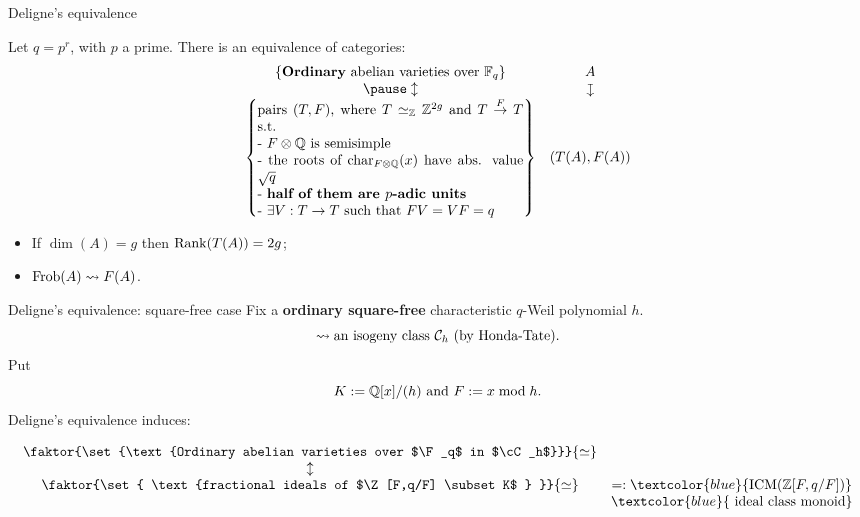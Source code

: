 \documentclass{beamer}
\begin{document}
\begin{frame}{ Deligne's equivalence }
\begin{theorem}[Deligne '69]
Let $q=p^r$, with $p$ a prime. There is an equivalence of categories:
\[\begin{array}{cc}
\set{\text{\textbf{Ordinary} abelian varieties over $\F_q$}}	& A \\
\pause \updownarrow							& \downmapsto \\
\set{\parbox[p]{19em}{pairs $(T,F)$, where $T\simeq_\Z \Z^{2g}$ and $T\overset{F}{\to} T$ s.t.\\
- $F\otimes \Q$ is semisimple\\
- the roots of $\Char_{F\otimes\Q}(x)$ have abs. value $\sqrt{q}$\\
- \textbf{half of them are $p$-adic units}\\
- $\exists V:T\to T$ such that $FV=VF=q$
}}	& (T(A),F(A))
\end{array}\]
\end{theorem}
\pause
\begin{remark}
\begin{itemize}
 \item If $\dim(A)=g$ then $\operatorname{Rank}(T(A))=2g$;
 \item $\operatorname{Frob}(A)\rightsquigarrow F(A)$.
\end{itemize}
\end{remark}
\end{frame}

\begin{frame}{ Deligne's equivalence: square-free case}
Fix a \textbf{ordinary square-free} characteristic $q$-Weil polynomial $h$.\\
\[\rightsquigarrow \text{an isogeny class ${\mathcal C}_h$ (by Honda-Tate)}.\]
\pause Put 
\[K := \mathbb{Q}[x]/(h) \text{ and } F:= x \bmod h. \]
\pause Deligne's equivalence induces:
\begin{theorem}
\vspace{-5mm}\[\begin{array}{cc}
\faktor{\set{\text{Ordinary abelian varieties over $\F_q$ in $\cC_h$}}}{\simeq} & \\
\updownarrow & \\
\faktor{\set{ \text{fractional ideals of $\Z[F,q/F] \subset K$ } }}{\simeq} & =:\textcolor{blue}{\ICM(\Z[F,q/F])}\\ 
  & \textcolor{blue}{\text{ ideal class monoid} }
  \end{array}\]
\end{theorem}
\end{frame}
\end{document}
